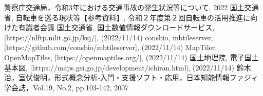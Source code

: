 \documentclass[a4j,8.5pt, twocolumn,fleqn]{jbook}
\begin{document}
\begin{thebibliography}{9}
    警察庁交通局，令和3年における交通事故の発生状況等について, 2022
    国土交通省, 自転車を巡る現状等【参考資料】, 令和２年度第２回自転車の活用推進に向けた有識者会議
    国土交通省, 国土数値情報ダウンロードサービス, [https://nlftp.mlit.go.jp/ksj/], (2022/11/14)
    consbio, mbtileserver, [https://github.com/consbio/mbtileserver], (2022/11/14)
    MapTiler, OpenMapTiles, [https://openmaptiles.org/], (2022/11/14)
    国土地理院, 電子国土基本図, [https://maps.gsi.go.jp/development/ichiran.html], (2022/11/14)
    鈴木治，室伏俊明，形式概念分析-入門・支援ソフト・応用，日本知能情報ファジィ学会誌，Vol.19, No.2, pp.103-142, 2007
\end{thebibliography}

\appendix
\onecolumn
\end{document}
